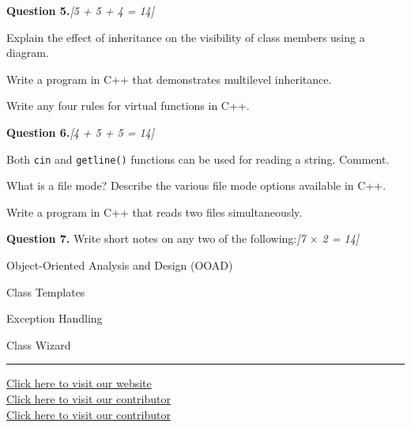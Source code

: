 \documentclass[11pt,a4paper]{article}
\newcommand{\pts}[1]{\hfill   \textit{[#1]}}
\begin{document}
\noindent   \textbf{Question 5.}\pts{5 + 5 + 4 = 14}

\begin{parts}
  \item Explain the effect of inheritance on the visibility of class members using a diagram.
  \item Write a program in C++ that demonstrates multilevel inheritance.
  \item Write any four rules for virtual functions in C++.
\end{parts}

\bigskip


\noindent   \textbf{Question 6.}\pts{4 + 5 + 5 = 14}

\begin{parts}
  \item Both   \texttt{cin} and   \texttt{getline()} functions can be used for reading a string. Comment.
  \item What is a file mode? Describe the various file mode options available in C++.
  \item Write a program in C++ that reads two files simultaneously.
\end{parts}

\bigskip


\noindent   \textbf{Question 7.} Write short notes on any two of the following:\pts{7 $ \times$ 2 = 14}

\begin{parts}
  \item Object-Oriented Analysis and Design (OOAD)
  \item Class Templates
  \item Exception Handling
  \item Class Wizard
\end{parts}

\vfill
\rule{\linewidth}{0.4pt}

\begin{center}\small
\href{https://bhu-exam.vercel.app/}{Click here to visit our website}\\[4pt]\href{https://me-aryan.vercel.app/}{Click here to visit our contributor}\\[4pt]\href{https://quashan-me.vercel.app/}{Click here to visit our contributor}
\end{center}
\end{document}
